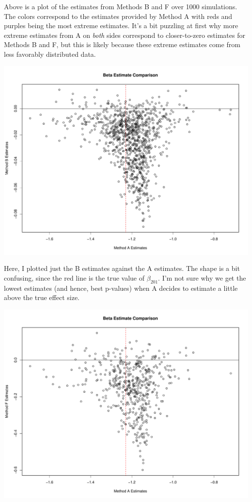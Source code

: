 \documentclass[11pt]{article} %
\begin{document}
Above is a plot of the estimates from Methods B and F over 1000 simulations. The colors correspond to the estimates provided by Method A with reds and purples being the most extreme estimates. It's a bit puzzling at first why more extreme estimates from A on \emph{both} sides correspond to closer-to-zero estimates for Methods B and F, but this is likely because these extreme estimates come from less favorably distributed data.

\includegraphics[scale=0.5]{AB Comparison Big.pdf}

Here, I plotted just the B estimates against the A estimates. The shape is a bit confusing, since the red line is the true value of $\beta_{201}$. I'm not sure why we get the lowest estimates (and hence, best p-values) when A decides to estimate a little above the true effect size.

\includegraphics[scale=0.5]{AF Comparison Big.pdf}
\end{document}
